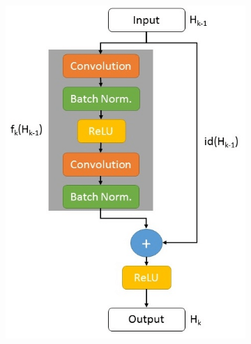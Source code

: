 \begin{figure}
    \begin{subfigure}{.61\textwidth}
        \centering
        \includegraphics[width=.8\linewidth]{figs/convblock.png}
        \label{fig:convblock}
    \end{subfigure}
    \begin{subfigure}{.5\textwidth}
        \centering

\end{subfigure}
\end{figure}

